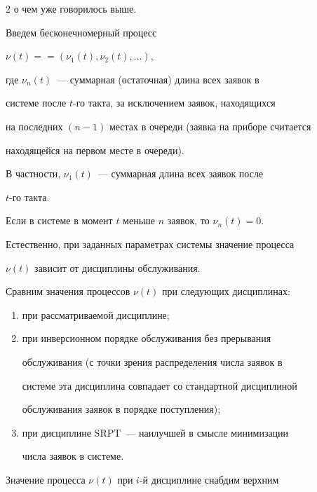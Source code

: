 \begin{multicols}{2}
о чем уже говорилось выше.





Введем бесконечномерный процесс


$\nu(t) =$\linebreak $= (\nu_1(t),\nu_2(t),\ldots)$,


где $\nu_n(t)$~--- суммарная (остаточная) длина всех заявок в


системе после $t$-го такта, за исключением заявок, находящихся


на последних $(n-1)$ местах в очереди (заявка на приборе считается


находящейся на первом месте в очереди).


В частности, $\nu_1(t)$~--- суммарная длина всех заявок после


$t$-го такта.


Если в системе в момент $t$ меньше $n$ заявок, то $\nu_n(t)=0$.


Естественно, при заданных параметрах системы значение процесса


$\nu(t)$ зависит от дисциплины обслуживания.





Сравним значения процессов $\nu(t)$ при сле\-ду\-ющих дисциплинах:


\begin{enumerate}[(1)]


\item при рассматриваемой дисциплине;


\item


при инверсионном порядке обслуживания без прерывания


обслуживания (с точки зрения распределения числа заявок в


системе эта дисциплина совпадает со стандартной дисциплиной


обслуживания заявок в порядке поступления);


\item


 при дисциплине SRPT~--- наилучшей в смысле минимизации


числа заявок в системе.


\end{enumerate}





Значение процесса $\nu(t)$ при $i$-й дисциплине снабдим верхним



\end{multicols}
